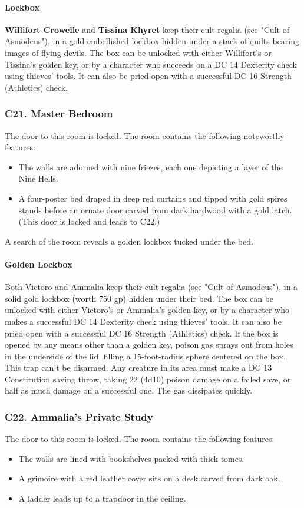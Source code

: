 \documentclass[10pt,a4paper,twoside,twocolumn,openany,nodeprecatedcode]{dndbook}
\begin{document}
\paragraph{Lockbox}
\textbf{Willifort Crowelle} and \textbf{Tissina Khyret} keep their cult regalia (see "Cult of Asmodeus"), in a gold-embellished lockbox hidden under a stack of quilts bearing images of flying devils. The box can be unlocked with either Willifort's or Tissina's golden key, or by a character who succeeds on a DC 14 Dexterity check using thieves' tools. It can also be pried open with a successful DC 16 Strength (Athletics) check.
\subsubsection{C21. Master Bedroom}
The door to this room is locked. The room contains the following noteworthy features:
\begin{itemize}

\item The walls are adorned with nine friezes, each one depicting a layer of the Nine Hells.
\item A four-poster bed draped in deep red curtains and tipped with gold spires stands before an ornate door carved from dark hardwood with a gold latch. (This door is locked and leads to C22.)
\end{itemize}


A search of the room reveals a golden lockbox tucked under the bed.
\paragraph{Golden Lockbox}
Both Victoro and Ammalia keep their cult regalia (see "Cult of Asmodeus"), in a solid gold lockbox (worth 750 gp) hidden under their bed. The box can be unlocked with either Victoro's or Ammalia's golden key, or by a character who makes a successful DC 14 Dexterity check using thieves' tools. It can also be pried open with a successful DC 16 Strength (Athletics) check.
If the box is opened by any means other than a golden key, poison gas sprays out from holes in the underside of the lid, filling a 15-foot-radius sphere centered on the box. This trap can't be disarmed. Any creature in its area must make a DC 13 Constitution saving throw, taking 22 (4d10) poison damage on a failed save, or half as much damage on a successful one. The gas dissipates quickly.
\subsubsection{C22. Ammalia's Private Study}
The door to this room is locked. The room contains the following features:
\begin{itemize}

\item The walls are lined with bookshelves packed with thick tomes.
\item A grimoire with a red leather cover sits on a desk carved from dark oak.
\item A ladder leads up to a trapdoor in the ceiling.
\end{itemize}
\end{document}
